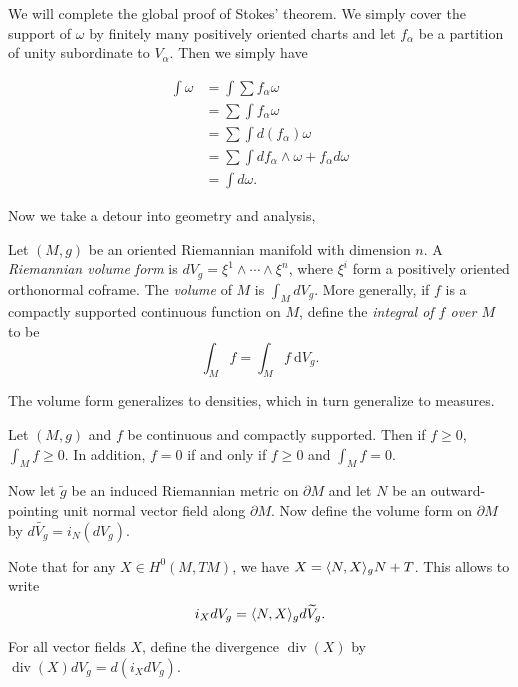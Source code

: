 \documentclass[twoside, 10pt]{article}
\renewcommand{\d}{\ \mathrm{d}}
\begin{document}
    We will complete the global proof of Stokes' theorem. We simply cover the support of $\omega$ by finitely many positively oriented charts and let $f_{\alpha}$ be a partition of unity subordinate to $V_{\alpha}$. Then we simply have

    \begin{align*}
        \int \omega &= \int \sum f_{\alpha} \omega \\
                    &= \sum \int f_{\alpha} \omega \\
                    &= \sum \int d (f_{\alpha}) \omega \\
                    &= \sum \int df_{\alpha} \wedge \omega + f_{\alpha} d\omega \\
                    &= \int d\omega.
    \end{align*}

    Now we take a detour into geometry and analysis,

    \begin{defn}
        Let $(M,g)$ be an oriented Riemannian manifold with dimension $n$. A \textit{Riemannian volume form} is $dV_g = \xi^1 \wedge \cdots \wedge \xi^n$, where $\xi^i$ form a positively oriented orthonormal coframe. The \textit{volume} of $M$ is $\int_M dV_g$. More generally, if $f$ is a compactly supported continuous function on $M$, define the \textit{integral of $f$ over $M$} to be
        \[ \int_M f = \int_M f\d V_g.\]
    \end{defn}

    \begin{rmk}
        The volume form generalizes to densities, which in turn generalize to measures.
    \end{rmk}

    \begin{lem}
        Let $(M,g)$ and $f$ be continuous and compactly supported. Then if $f \geq 0$, $\int_M f \geq 0$. In addition, $f = 0$ if and only if $f \geq 0$ and $\int_M f = 0$.
    \end{lem}

    Now let $\widetilde{g}$ be an induced Riemannian metric on $\partial M$ and let $N$ be an outward-pointing unit normal vector field along $\partial M$. Now define the volume form on $\partial M$ by $d \widetilde{V_g} = i_N(dV_g)$.

    Note that for any $X \in H^0(M,TM)$, we have $X = \langle N,X\rangle_g N + T$.
    This allows to write
    \[ i_X dV_g = \langle N,X\rangle_g d \widetilde{V}_g.\]

    \begin{defn}
        For all vector fields $X$, define the divergence $\operatorname{div}(X)$ by $\operatorname{div}(X) dV_g = d(i_X dV_g)$.
    \end{defn}
\end{document}
